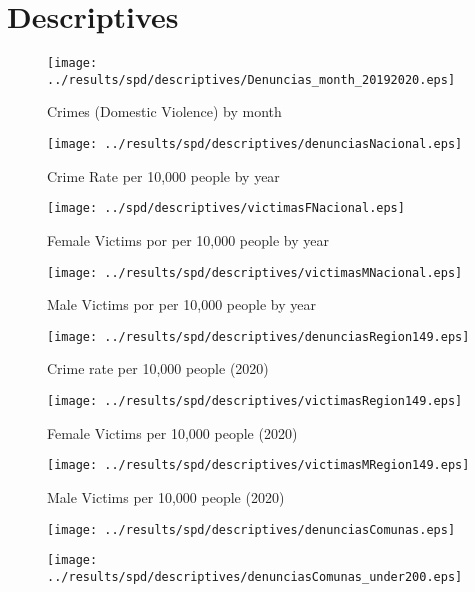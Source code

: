 \documentclass[11pt,letterpaper]{article}
\begin{document}
\section{Descriptives}
\begin{figure}[H]
\caption{Crimes (Domestic Violence) by month}
\centering
\texttt{[image: ../results/spd/descriptives/Denuncias\_month\_20192020.eps]}
\end{figure}

\begin{figure}[H]
\caption{Crime Rate per 10,000 people by year}
\centering
\texttt{[image: ../results/spd/descriptives/denunciasNacional.eps]}
\end{figure}

\begin{figure}[H]
\caption{Female Victims por per 10,000 people by year}
\centering
\texttt{[image: ../spd/descriptives/victimasFNacional.eps]}
\end{figure}

\begin{figure}[H]
\caption{Male Victims por per 10,000 people by year}
\centering
\texttt{[image: ../results/spd/descriptives/victimasMNacional.eps]}
\end{figure}

\begin{figure}[H]
\caption{Crime rate per 10,000 people (2020)}
\centering
\texttt{[image: ../results/spd/descriptives/denunciasRegion149.eps]}
\end{figure}

\begin{figure}[H]
\caption{Female Victims per 10,000 people (2020)}
\centering
\texttt{[image: ../results/spd/descriptives/victimasRegion149.eps]}
\end{figure}

\begin{figure}[H]
\caption{Male Victims per 10,000 people (2020)}
\centering
\texttt{[image: ../results/spd/descriptives/victimasMRegion149.eps]}
\end{figure}

\begin{figure}[H]
\caption{}
\centering
\texttt{[image: ../results/spd/descriptives/denunciasComunas.eps]}
\end{figure}

\begin{figure}[H]
\caption{}
\centering
\texttt{[image: ../results/spd/descriptives/denunciasComunas\_under200.eps]}
\end{figure}
\end{document}
